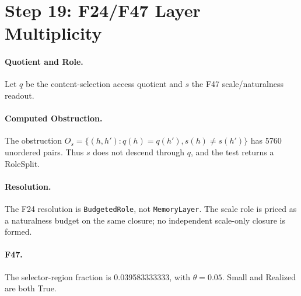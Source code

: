 \section{Step 19: F24/F47 Layer Multiplicity}

\paragraph{Quotient and Role.}
Let \(q\) be the content-selection access quotient and \(s\) the F47 scale/naturalness readout.

\paragraph{Computed Obstruction.}
The obstruction \(O_s=\{(h,h') : q(h)=q(h'), s(h)\ne s(h')\}\) has 5760 unordered pairs. Thus \(s\) does not descend through \(q\), and the test returns a RoleSplit.

\paragraph{Resolution.}
The F24 resolution is \texttt{BudgetedRole}, not \texttt{MemoryLayer}. The scale role is priced as a naturalness budget on the same closure; no independent scale-only closure is formed.

\paragraph{F47.}
The selector-region fraction is 0.039583333333, with \(\theta=0.05\). Small and Realized are both True.

